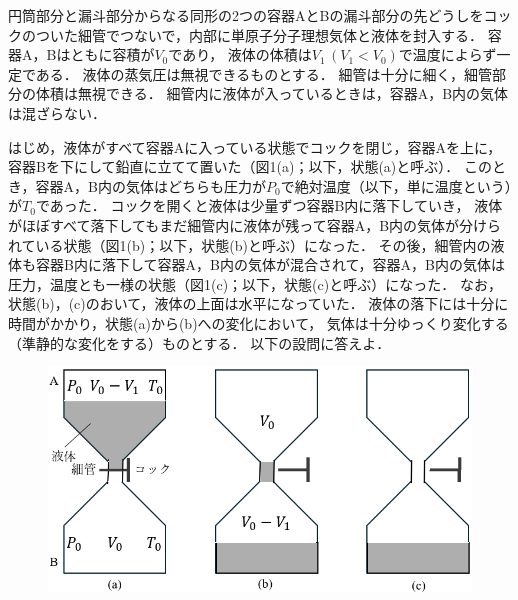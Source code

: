\setcounter{figure}{0}
円筒部分と漏斗部分からなる同形の2つの容器AとBの漏斗部分の先どうしをコックのついた細管でつないで，内部に単原子分子理想気体と液体を封入する．
容器A，Bはともに容積が$V_0$であり，
液体の体積は$V_1\,(V_1<V_0)$で温度によらず一定である．
液体の蒸気圧は無視できるものとする．
細管は十分に細く，細管部分の体積は無視できる．
細管内に液体が入っているときは，容器A，B内の気体は混ざらない．

はじめ，液体がすべて容器Aに入っている状態でコックを閉じ，容器Aを上に，容器Bを下にして鉛直に立てて置いた（図1(a)；以下，状態(a)と呼ぶ）．
このとき，容器A，B内の気体はどちらも圧力が$P_0$で絶対温度（以下，単に温度という）が$T_0$であった．
コックを開くと液体は少量ずつ容器B内に落下していき，
液体がほぼすべて落下してもまだ細管内に液体が残って容器A，B内の気体が分けられている状態（図1(b)；以下，状態(b)と呼ぶ）になった．
その後，細管内の液体も容器B内に落下して容器A，B内の気体が混合されて，容器A，B内の気体は圧力，温度とも一様の状態（図1(c)；以下，状態(c)と呼ぶ）になった．
なお，状態(b)，(c)のおいて，液体の上面は水平になっていた．
液体の落下には十分に時間がかかり，状態(a)から(b)への変化において，
気体は十分ゆっくり変化する（準静的な変化をする）ものとする．
以下の設問に答えよ．


\begin{figure}[H]
  \centering
  \includegraphics[width=.8\columnwidth]{../graphs/open_19_8_3-1.png}
  \caption{}
\end{figure}

